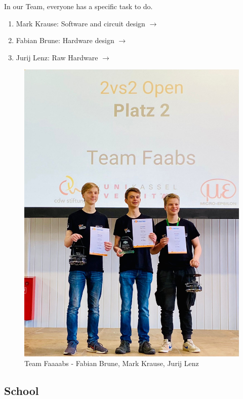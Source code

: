 \documentclass{scrartcl}
\begin{document}
    
    In our Team, everyone has a specific task to do.
\begin{enumerate}
    \item{Mark Krause: Software and circuit design $\rightarrow$ }
    \item{Fabian Brune: Hardware design $\rightarrow$ }
    \item{Jurij Lenz: Raw Hardware $\rightarrow$ }
\end{enumerate}
\begin{figure}[h]
    \centering
    \includegraphics[width=\textwidth]{img/Siegerehrung Kassel 1.png}
    \caption{Team Faaaabs - Fabian Brune, Mark Krause, Jurij Lenz}
    \label{fig:team}
\end{figure}

\newpage

\subsection{School}
\end{document}

